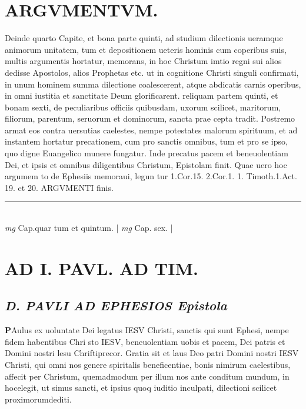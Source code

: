 \documentclass{article}
\begin{document}
\begin{pages}
\section*{ARGVMENTVM.  }\pstart Deinde quarto Capite, et bona parte quinti, ad studium dilectionis ueramque animorum unitatem, tum et depositionem ueteris hominis cum coperibus suis, multis argumentis hortatur, memorans, in hoc Christum imtio regni sui alios dedisse Apostolos, alios Prophetas etc. ut in cognitione Christi singuli confirmati, in unum hominem summa dilectione coalescerent, atque abdicatis carnis operibus, in omni iustitia et sanctitate Deum glorificarent. reliquam partem quinti, et bonam sexti, de peculiaribus officiis quibusdam, uxorum scilicet, maritorum, filiorum, parentum, seruorum et dominorum, sancta prae cepta tradit.  Postremo armat eos contra uersutias caelestes, nempe potestates malorum spirituum, et ad instantem hortatur precationem, cum pro sanctis omnibus, tum et pro se ipso, quo digne Euangelico munere fungatur.  Inde precatus pacem et beneuolentiam Dei, et ipsis et omnibus diligentibus Christum, Epistolam finit. Quae uero hoc argumem to de Ephesiis memoraui, legun tur 1.Cor.15. 2.Cor.1. 1. Timoth.1.Act. 19. et 20. ARGVMENTI finis.   \pend
\vspace{0.5cm}\noindent
\vspace{0.2cm}\rule{1cm}{0.2pt}\\ 
\hspace{0.2cm}\textit{mg}
\footnotesize Cap.quar tum et quintum. 
\normalsize| 
\hspace{0.2cm}\textit{mg}
\footnotesize Cap.  sex.  
\normalsize| 
\section*{AD I. PAVL. AD TIM. }
\marginpar{[ p.9 ]}
\marginpar{[ p.10 ]}
\marginpar{[ p.11 ]}
\marginpar{[ p.B ]}
{}
\subsection*{\textit{D. PAVLI AD EPHESIOS Epistola}}\pstart \huge\textbf{P}\normalsize Aulus ex uoluntate Dei legatus IESV Christi, sanctis qui sunt Ephesi, nempe fidem habentibus Chri sto IESV, beneuolentiam uobis et pacem, Dei patris et Domini nostri lesu Chriftiprecor.  \pend\pstart Gratia sit et laus Deo patri Domini nostri IESV Christi, qui omni nos genere spiritalis beneficentiae, bonis nimirum caelestibus, affecit per Christum, quemadmodum per illum nos ante conditum mundum, in hocelegit, ut simus sancti, et ipsius quoq iuditio inculpati, dilectioni scilicet proximorumdediti.  \pend

\end{pages}
\end{document}
